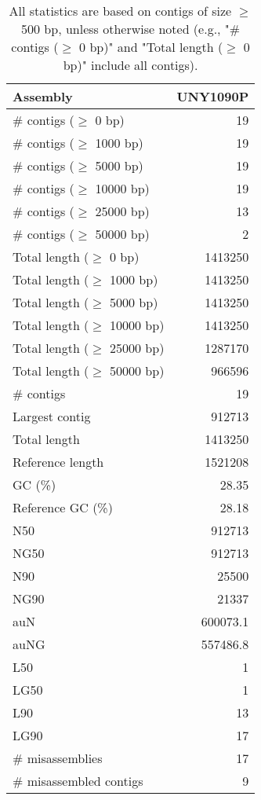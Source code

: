 \documentclass[12pt,a4paper]{article}
\begin{document}
\begin{table}[ht]
\begin{center}
\caption{All statistics are based on contigs of size $\geq$ 500 bp, unless otherwise noted (e.g., "\# contigs ($\geq$ 0 bp)" and "Total length ($\geq$ 0 bp)" include all contigs).}
\begin{tabular}{|l*{1}{|r}|}
\hline
Assembly & UNY1090P \\ \hline
\# contigs ($\geq$ 0 bp) & 19 \\ \hline
\# contigs ($\geq$ 1000 bp) & 19 \\ \hline
\# contigs ($\geq$ 5000 bp) & 19 \\ \hline
\# contigs ($\geq$ 10000 bp) & 19 \\ \hline
\# contigs ($\geq$ 25000 bp) & 13 \\ \hline
\# contigs ($\geq$ 50000 bp) & 2 \\ \hline
Total length ($\geq$ 0 bp) & 1413250 \\ \hline
Total length ($\geq$ 1000 bp) & 1413250 \\ \hline
Total length ($\geq$ 5000 bp) & 1413250 \\ \hline
Total length ($\geq$ 10000 bp) & 1413250 \\ \hline
Total length ($\geq$ 25000 bp) & 1287170 \\ \hline
Total length ($\geq$ 50000 bp) & 966596 \\ \hline
\# contigs & 19 \\ \hline
Largest contig & 912713 \\ \hline
Total length & 1413250 \\ \hline
Reference length & 1521208 \\ \hline
GC (\%) & 28.35 \\ \hline
Reference GC (\%) & 28.18 \\ \hline
N50 & 912713 \\ \hline
NG50 & 912713 \\ \hline
N90 & 25500 \\ \hline
NG90 & 21337 \\ \hline
auN & 600073.1 \\ \hline
auNG & 557486.8 \\ \hline
L50 & 1 \\ \hline
LG50 & 1 \\ \hline
L90 & 13 \\ \hline
LG90 & 17 \\ \hline
\# misassemblies & 17 \\ \hline
\# misassembled contigs & 9 \\ \hline

\end{tabular}
\end{center}
\end{table}
\end{document}
